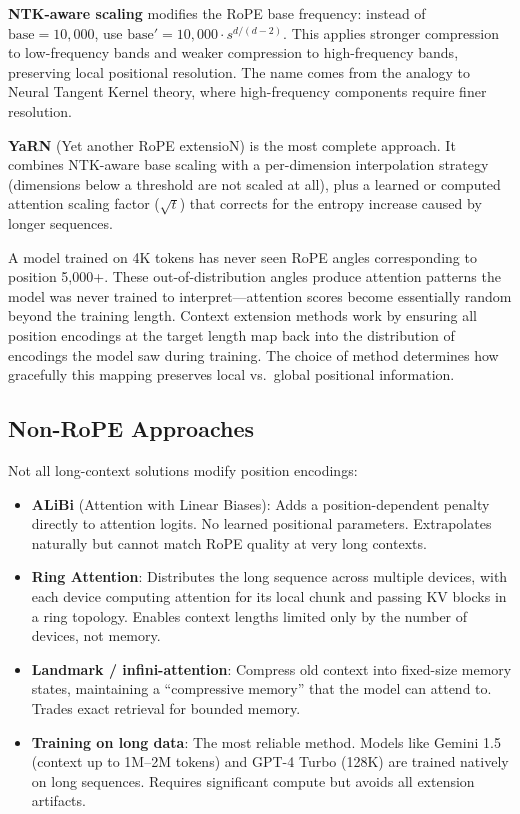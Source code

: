 \textbf{NTK-aware scaling} modifies the RoPE base frequency: instead of $\text{base} = 10{,}000$, use $\text{base}' = 10{,}000 \cdot s^{d/(d-2)}$. This applies stronger compression to low-frequency bands and weaker compression to high-frequency bands, preserving local positional resolution. The name comes from the analogy to Neural Tangent Kernel theory, where high-frequency components require finer resolution.

\textbf{YaRN} (Yet another RoPE extensioN) is the most complete approach. It combines NTK-aware base scaling with a per-dimension interpolation strategy (dimensions below a threshold are not scaled at all), plus a learned or computed attention scaling factor ($\sqrt{t}$) that corrects for the entropy increase caused by longer sequences.

\begin{keyinsight}
A model trained on 4K tokens has never seen RoPE angles corresponding to position 5,000+. These out-of-distribution angles produce attention patterns the model was never trained to interpret---attention scores become essentially random beyond the training length. Context extension methods work by ensuring all position encodings at the target length map back into the distribution of encodings the model saw during training. The choice of method determines how gracefully this mapping preserves local vs.\ global positional information.
\end{keyinsight}

\subsection{Non-RoPE Approaches}

Not all long-context solutions modify position encodings:

\begin{itemize}
    \item \textbf{ALiBi} (Attention with Linear Biases): Adds a position-dependent penalty directly to attention logits. No learned positional parameters. Extrapolates naturally but cannot match RoPE quality at very long contexts.
    \item \textbf{Ring Attention}: Distributes the long sequence across multiple devices, with each device computing attention for its local chunk and passing KV blocks in a ring topology. Enables context lengths limited only by the number of devices, not memory.
    \item \textbf{Landmark / infini-attention}: Compress old context into fixed-size memory states, maintaining a ``compressive memory'' that the model can attend to. Trades exact retrieval for bounded memory.
    \item \textbf{Training on long data}: The most reliable method. Models like Gemini 1.5 (context up to 1M--2M tokens) and GPT-4 Turbo (128K) are trained natively on long sequences. Requires significant compute but avoids all extension artifacts.
\end{itemize}

